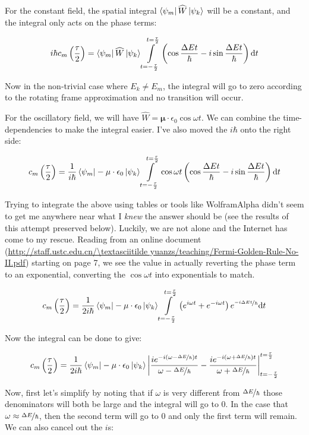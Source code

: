 \documentclass[12pt, openany, letterpaper]{memoir}
\begin{document}
For the constant field, the spatial integral $\left< \psi_m \right|\widehat{W} \left| \psi_k \right>$ will be a constant, and the integral only acts on the phase terms:

$$
i\hbar c_m\left(\frac{\tau}{2}\right) = \left< \psi_m \right|\widehat{W} \left| \psi_k \right> \int\limits_{t=-\frac{\tau}{2}}^{t=\frac{\tau}{2}}\left(\cos \frac{\Delta Et}{\hbar} - i\sin\frac{\Delta Et}{\hbar}\right)\mathrm{d}t
$$

Now in the non-trivial case where $E_k\neq E_m$, the integral will go to zero according to the rotating frame approximation and no transition will occur.

For the oscillatory field, we will have $\widehat{W} = \mathbf{\mu}\cdot\epsilon_0\cos\omega t$. We can combine the time-dependencies to make the integral easier. I've also moved the $i\hbar$ onto the right side:

$$
c_m\left(\frac{\tau}{2}\right) = \frac{1}{i\hbar}\left< \psi_m \right|-\mathbf{\mu}\cdot\epsilon_0 \left| \psi_k \right> \int\limits_{t=-\frac{\tau}{2}}^{t=\frac{\tau}{2}}\cos{\omega t}\left(\cos \frac{\Delta Et}{\hbar} - i\sin\frac{\Delta Et}{\hbar}\right)\mathrm{d}t
$$

Trying to integrate the above using tables or tools like WolframAlpha didn't seem to get me anywhere near what I \emph{knew} the answer should be (see the results of this attempt preserved below). Luckily, we are not alone and the Internet has come to my rescue. Reading from an online document (\url{http://staff.ustc.edu.cn/\textasciitilde yuanzs/teaching/Fermi-Golden-Rule-No-II.pdf}) starting on page 7, we see the value in actually reverting the phase term to an exponential, converting the $\cos\omega t$ into exponentials to match.

$$
c_m\left(\frac{\tau}{2}\right) = \frac{1}{2i\hbar}\left< \psi_m \right|-\mathbf{\mu}\cdot\epsilon_0 \left| \psi_k \right> \int\limits_{t=-\frac{\tau}{2}}^{t=\frac{\tau}{2}}\left(e^{i\omega t}+e^{-i\omega t}\right)e^{\nicefrac{-i\Delta Et}{\hbar}}\mathrm{d}t
$$

Now the integral can be done to give:

$$
c_m\left(\frac{\tau}{2}\right) = \frac{1}{2i\hbar}\left< \psi_m \right|-\mathbf{\mu}\cdot\epsilon_0 \left| \psi_k \right> \left| \frac{ie^{-i\left(\omega-\nicefrac{\Delta E}{\hbar}\right)t}}{\omega - \nicefrac{\Delta E}{\hbar}} - \frac{ie^{-i\left(\omega+\nicefrac{\Delta E}{\hbar}\right)t}}{\omega + \nicefrac{\Delta E}{\hbar}}\right|_{t=-\frac{\tau}{2}}^{t=\frac{\tau}{2}}
$$

Now, first let's simplify by noting that if $\omega$ is very different from $\nicefrac{\Delta E}{\hbar}$ those denominators will both be large and the integral will go to $0$. In the case that $\omega\approx\nicefrac{\Delta E}{\hbar}$, then the second term will go to $0$ and only the first term will remain. We can also cancel out the $i$s:
\end{document}
